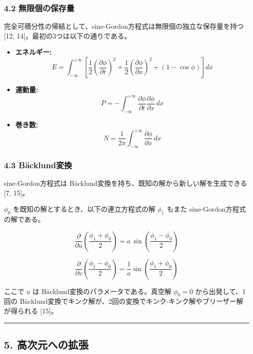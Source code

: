 \documentclass[a4paper,11pt]{ltjsarticle}
\begin{document}
\subsubsection{4.2
無限個の保存量}\label{ux7121ux9650ux500bux306eux4fddux5b58ux91cf}

完全可積分性の帰結として、sine-Gordon方程式は無限個の独立な保存量を持つ
{[}12, 14{]}。最初の3つは以下の通りである。

\begin{itemize}
\item
  \textbf{エネルギー:}
  \[E = \int_{-\infty}^{+\infty}\left[\frac{1}{2}\left(\frac{\partial\phi}{\partial t}\right)^2 + \frac{1}{2}\left(\frac{\partial\phi}{\partial x}\right)^2 + (1-\cos\phi)\right]dx\]
\item
  \textbf{運動量:}
  \[P = -\int_{-\infty}^{+\infty}\frac{\partial\phi}{\partial t}\frac{\partial\phi}{\partial x}\,dx\]
\item
  \textbf{巻き数:}
  \[N = \frac{1}{2\pi}\int_{-\infty}^{+\infty}\frac{\partial\phi}{\partial x}\,dx\]
\end{itemize}

\subsubsection{4.3 Bäcklund変換}\label{buxe4cklundux5909ux63db}

sine-Gordon方程式は Bäcklund変換を持ち、既知の解から新しい解を生成できる
{[}7, 15{]}。

\(\phi_0\) を既知の解とするとき、以下の連立方程式の解 \(\phi_1\) もまた
sine-Gordon方程式の解である。

\[\frac{\partial}{\partial u}\left(\frac{\phi_1 + \phi_0}{2}\right) = a\,\sin\left(\frac{\phi_1 - \phi_0}{2}\right)\]

\[\frac{\partial}{\partial v}\left(\frac{\phi_1 - \phi_0}{2}\right) = \frac{1}{a}\sin\left(\frac{\phi_1 + \phi_0}{2}\right)\]

ここで \(a\) は Bäcklund変換のパラメータである。真空解 \(\phi_0 = 0\)
から出発して、1回の
Bäcklund変換でキンク解が、2回の変換でキンク-キンク解やブリーザー解が得られる
{[}15{]}。

\begin{center}\rule{0.5\linewidth}{0.5pt}\end{center}

\subsection{5.
高次元への拡張}\label{ux9ad8ux6b21ux5143ux3078ux306eux62e1ux5f35}
\end{document}
